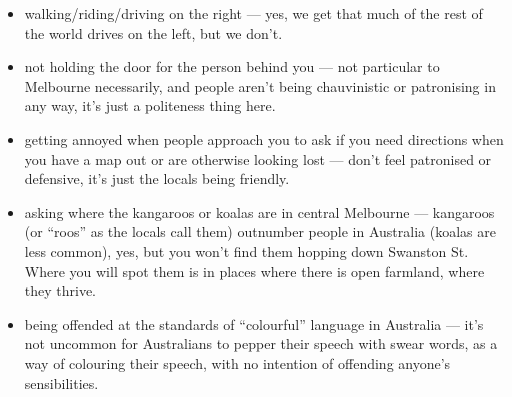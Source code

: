 \begin{itemize}
  in general, the more obscure the location, the more hipster the caf\'e
  and more authentically local the clientele.
\item walking/riding/driving on the right --- yes, we get that much of
  the rest of the world drives on the left, but we don't.
\item not holding the door for the person behind you --- not particular
  to Melbourne necessarily, and people aren't being chauvinistic or
  patronising in any way, it's just a politeness thing here.
\item getting annoyed when people approach you to ask if you need
  directions when you have a map out or are otherwise looking lost ---
  don't feel patronised or defensive, it's just the locals being
  friendly.
\item asking where the kangaroos or koalas are in central Melbourne ---
  kangaroos (or ``roos'' as the locals call them) outnumber people in
  Australia (koalas are less common), yes, but you won't find them
  hopping down Swanston St. Where you will spot them is in places where
  there is open farmland, where they thrive.
\item being offended at the standards of ``colourful'' language in
  Australia --- it's not uncommon for Australians to pepper their speech
  with swear words, as a way of colouring their speech, with no
  intention of offending anyone's sensibilities.
\end{itemize}


